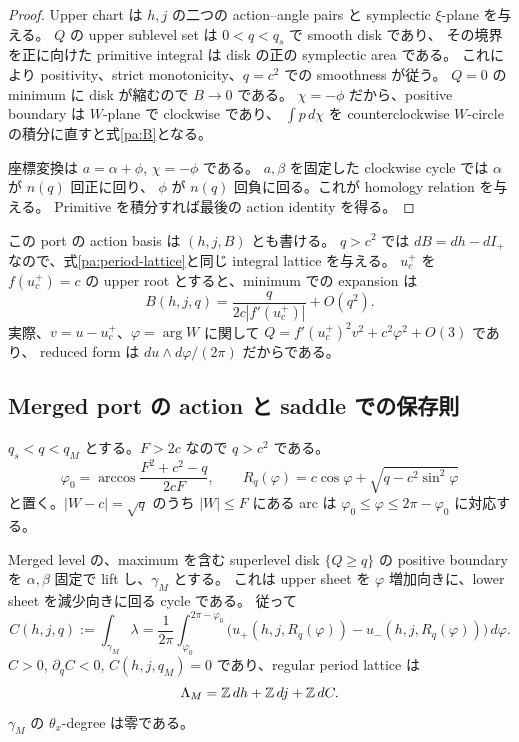 \begin{proof}
Upper chart は $h,j$ の二つの action--angle pairs と symplectic $\xi$-plane を与える。
$Q$ の upper sublevel set は $0<q<q_s$ で smooth disk であり、
その境界を正に向けた primitive integral は disk の正の symplectic area である。
これにより positivity、strict monotonicity、$q=c^2$ での smoothness が従う。
$Q=0$ の minimum に disk が縮むので $B\to0$ である。
$\chi=-\phi$ だから、positive boundary は $W$-plane で clockwise であり、
$\int p\,d\chi$ を counterclockwise $W$-circle の積分に直すと式\eqref{pa:B}となる。

座標変換は $a=\alpha+\phi$, $\chi=-\phi$ である。
$a,\beta$ を固定した clockwise cycle では $\alpha$ が $n(q)$ 回正に回り、
$\phi$ が $n(q)$ 回負に回る。これが homology relation を与える。
Primitive を積分すれば最後の action identity を得る。
\end{proof}

この port の action basis は $(h,j,B)$ とも書ける。
$q>c^2$ では $dB=dh-dI_+$ なので、式\eqref{pa:period-lattice}と同じ integral lattice を与える。
$u_c^+$ を $f(u_c^+)=c$ の upper root とすると、minimum での expansion は
\begin{equation}\label{pa:upper-min}
 B(h,j,q)=\frac{q}{2c|f'(u_c^+)|}+O(q^2).
\end{equation}
実際、$v=u-u_c^+$、$\varphi=\arg W$ に関して
$Q=f'(u_c^+)^2v^2+c^2\varphi^2+O(3)$ であり、
reduced form は $du\wedge d\varphi/(2\pi)$ だからである。

\subsection{Merged port の action と saddle での保存則}

$q_s<q<q_M$ とする。$F>2c$ なので $q>c^2$ である。
\[
 \varphi_0=\arccos\frac{F^2+c^2-q}{2cF},
 \qquad
 R_q(\varphi)=c\cos\varphi+\sqrt{q-c^2\sin^2\varphi}
\]
と置く。$|W-c|=\sqrt q$ のうち $|W|\le F$ にある arc は
$\varphi_0\le\varphi\le2\pi-\varphi_0$ に対応する。

Merged level の、maximum を含む superlevel disk $\{Q\ge q\}$ の positive boundary を
$\alpha,\beta$ 固定で lift し、$\gamma_M$ とする。
これは upper sheet を $\varphi$ 増加向きに、lower sheet を減少向きに回る cycle である。
従って
\begin{equation}\label{pa:C}
 C(h,j,q):=\int_{\gamma_M}\lambda
 =\frac1{2\pi}\int_{\varphi_0}^{2\pi-\varphi_0}
    \bigl(u_+(h,j,R_q(\varphi))-u_-(h,j,R_q(\varphi))\bigr)\,d\varphi.
\end{equation}
$C>0$, $\partial_q C<0$, $C(h,j,q_M)=0$ であり、regular period lattice は
\[
 \Lambda_M=\mathbb Z\,dh+\mathbb Z\,dj+\mathbb Z\,dC.
\]
$\gamma_M$ の $\theta_x$-degree は零である。

